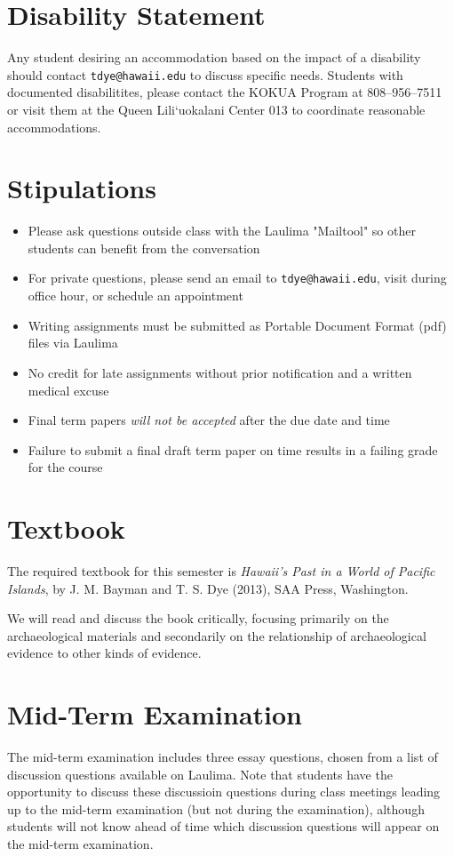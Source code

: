 \documentclass{scrartcl}
\begin{document}
\section{Disability Statement}
\label{sec:org424ae52}

Any student desiring an accommodation based on the impact of a disability should
contact \texttt{tdye@hawaii.edu} to discuss specific needs. Students with documented
disabilitites, please contact the KOKUA Program at 808--956--7511 or visit them
at the Queen Lili`uokalani Center 013 to coordinate reasonable accommodations.

\section{Stipulations}
\label{sec:org4502e38}
\begin{itemize}
\item Please ask questions outside class with the Laulima "Mailtool" so other
students can benefit from the conversation
\item For private questions, please send an email to \texttt{tdye@hawaii.edu}, visit
during office hour, or schedule an appointment
\item Writing assignments must be submitted as Portable Document Format
(pdf) files via Laulima
\item No credit for late assignments without prior notification and a written
medical excuse
\item Final term papers \emph{will not be accepted} after the due date and time
\item Failure to submit a final draft term paper on time results in a failing
grade for the course
\end{itemize}

\section{Textbook}
\label{sec:org16e5d07}

The required textbook for this semester is \emph{Hawaii's Past in a World
of Pacific Islands}, by J. M. Bayman and T. S. Dye (2013), SAA Press,
Washington.

We will read and discuss the book critically, focusing primarily on
the archaeological materials and secondarily on the relationship of
archaeological evidence to other kinds of evidence.

\section{Mid-Term Examination}
\label{sec:org3b9b574}
The mid-term examination includes three essay questions, chosen from a list of
discussion questions available on Laulima. Note that students have the
opportunity to discuss these discussioin questions during class meetings leading up
to the mid-term examination (but not during the examination), although students will
not know ahead of time which discussion questions will appear on the mid-term
examination.
\end{document}
